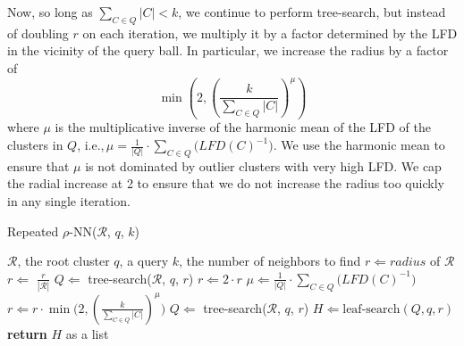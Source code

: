 Now, so long as $\sum_{C \in Q} |C| < k$, we continue to perform tree-search, but instead of doubling $r$ on each iteration, we multiply it by a factor determined by the LFD in the vicinity of the query ball.
In particular, we increase the radius by a factor of
\begin{equation}
    \min \left(2, \left( {\frac{k}{\sum_{C \in Q} |C|}} \right)^{\mu} \right)
    \label{eq:methods:repeated-rnn-factor}
\end{equation}
where $\mu$ is the multiplicative inverse of the harmonic mean of the LFD of the clusters in $Q$, i.e.,\,$\mu = \frac{1}{|Q|} \cdot \sum_{C \in Q} \big( LFD(C)^{-1} \big)$.
We use the harmonic mean to ensure that $\mu$ is not dominated by outlier clusters with very high LFD.
We cap the radial increase at 2 to ensure that we do not increase the radius too quickly in any single iteration.

\begin{algorithm} %
    \caption{Repeated $\rho$-NN($\mathcal{R}$, $q$, $k$)} %
    \label{alg:methods:repeated-rnn} %
    \begin{algorithmic} %
        \Require $\mathcal{R}$, the root cluster
        \Require $q$, a query
        \Require $k$, the number of neighbors to find
        \State $r \Leftarrow radius$ of $\mathcal{R}$
        \State $r \Leftarrow$ $\frac{r}{|\mathcal{R}|}$
        \State $Q \Leftarrow$ tree-search($\mathcal{R}$, $q$, $r$)
                \State $r \Leftarrow 2 \cdot r$
                \State $\mu \Leftarrow \frac{1}{|Q|} \cdot \sum_{C \in Q} \big( LFD(C)^{-1} \big)$
                \State $r \Leftarrow r \cdot \min \bigg( 2, \left( {\frac{k}{\sum_{C \in Q} |C|}} \right)^{\mu} \bigg)$
            \EndIf
            \State $Q \Leftarrow$ tree-search($\mathcal{R}$, $q$, $r$)
        \EndWhile
        \State $H \Leftarrow \text{leaf-search}(Q, q, r)$
        \State \textbf{return} $H$ as a list
    \end{algorithmic}
\end{algorithm}

